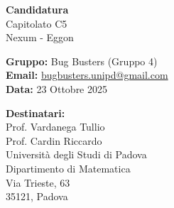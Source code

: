 \documentclass[a4paper,11pt]{article}
\newcommand{\fixeddate}{23 Ottobre 2025}
\begin{document}
\thispagestyle{empty}

\begin{tcolorbox}[
    colback=primarycolor!40,
    colframe=primarycolor!80,
    coltext=white,
    arc=3mm,
    boxrule=0pt,
    left=12pt,
    right=12pt,
    top=16pt,
    bottom=16pt
]
    \color{white}
    \begin{minipage}[c]{0.7\textwidth}
        {\Huge\bfseries Candidatura}\\[0.2cm]
        {\huge Capitolato C5}\\[0.3cm]
        {\Large Nexum - Eggon}
    \end{minipage}
    \hfill
    \begin{minipage}[c]{0.25\textwidth}
        \raggedleft
    \end{minipage}
\end{tcolorbox}

\vspace{1em}

\begin{tcolorbox}[
    colback=lightgray,
    colframe=lightgray,
    arc=3mm,
    boxrule=0pt,
    left=10pt,
    right=10pt,
    top=10pt,
    bottom=10pt
]
    \textbf{Gruppo:} Bug Busters (Gruppo 4)\\
    \textbf{Email:} \href{mailto:bugbusters.unipd@gmail.com}{bugbusters.unipd@gmail.com}\\
    \textbf{Data:} \fixeddate %
\end{tcolorbox}

\vspace{2em}

\noindent
\textbf{Destinatari:}\\
Prof. Vardanega Tullio\\
Prof. Cardin Riccardo\\
Università degli Studi di Padova\\
Dipartimento di Matematica\\
Via Trieste, 63\\
35121, Padova
\end{document}
